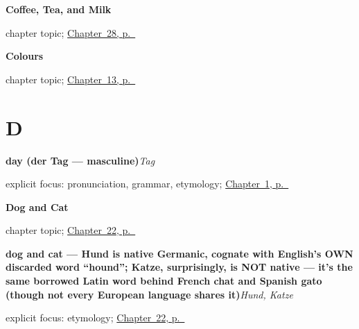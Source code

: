 \noindent\begin{minipage}[t]{\linewidth}
\raggedright
\textbf{Coffee, Tea, and Milk}\par
\footnotesize chapter topic; \hyperref[ch:ge-coffee-tea-milk]{Chapter~28, p.~\pageref*{ch:ge-coffee-tea-milk}}
\end{minipage}\par\smallskip

\noindent\begin{minipage}[t]{\linewidth}
\raggedright
\textbf{Colours}\par
\footnotesize chapter topic; \hyperref[ch:colours]{Chapter~13, p.~\pageref*{ch:colours}}
\end{minipage}\par\smallskip

\section*{D}

\noindent\begin{minipage}[t]{\linewidth}
\raggedright
\textbf{day (der Tag — masculine)}\enspace\emph{Tag}\par
\footnotesize explicit focus: pronunciation, grammar, etymology; \hyperref[ch:greetings]{Chapter~1, p.~\pageref*{ch:greetings}}
\end{minipage}\par\smallskip

\noindent\begin{minipage}[t]{\linewidth}
\raggedright
\textbf{Dog and Cat}\par
\footnotesize chapter topic; \hyperref[ch:ge-dog-and-cat]{Chapter~22, p.~\pageref*{ch:ge-dog-and-cat}}
\end{minipage}\par\smallskip

\noindent\begin{minipage}[t]{\linewidth}
\raggedright
\textbf{dog and cat — Hund is native Germanic, cognate with English's OWN discarded word \textquotedblleft{}hound\textquotedblright{}; Katze, surprisingly, is NOT native — it's the same borrowed Latin word behind French chat and Spanish gato (though not every European language shares it)}\enspace\emph{Hund, Katze}\par
\footnotesize explicit focus: etymology; \hyperref[ch:ge-dog-and-cat]{Chapter~22, p.~\pageref*{ch:ge-dog-and-cat}}
\end{minipage}\par\smallskip

